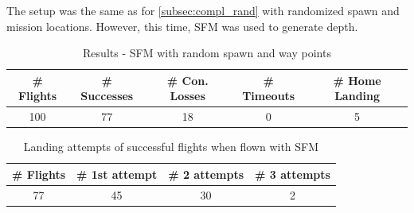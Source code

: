     The setup was the same as for \cref{subsec:compl_rand} with randomized spawn and mission locations. However, this time, SFM was used to generate depth.

    \begin{table}[h]
        \begin{center}
            \caption{Results - SFM with random spawn and way points}\vspace{1ex}
            \label{tab:result_SFM}
            \begin{tabular}{|c|c|c|c|c|}
            \hline
            \# Flights & \# Successes & \# Con. Losses & \# Timeouts & \# Home Landing\\ \hline \hline
            100 & 77 & 18 & 0 & 5 \\ 
            \hline
            \end{tabular}
        \end{center}
    \end{table}

    \begin{table}[h]
        \begin{center}
            \caption{Landing attempts of successful flights when flown with SFM}\vspace{1ex}
            \label{tab:land_nums_SFM}
            \begin{tabular}{|c|c|c|c|}
            \hline
            \# Flights & \# 1st attempt & \# 2 attempts & \# 3 attempts\\ \hline \hline
            77 & 45 & 30 & 2   \\
            \hline
            \end{tabular}
        \end{center}
    \end{table}

